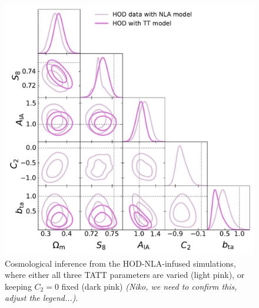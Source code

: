 \begin{figure}
\includegraphics[width=\columnwidth]{graphs/HOD_NLA.pdf}
\caption{Cosmological inference from the HOD-NLA-infused simulations, where either all three TATT parameters are varied (light pink), or keeping $C_2=0$ fixed (dark pink) {\it (Niko, we need to confirm this, adjust the legend...)}.}
\label{fig:triangle_HOD_NLA_combo}
\end{figure}